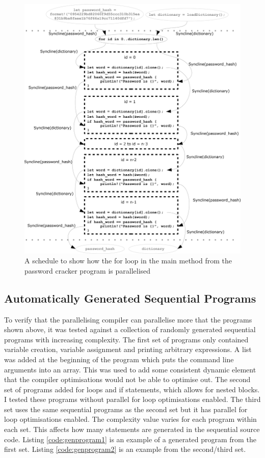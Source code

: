 \begin{figure}[H]
    \centering
    \includegraphics[width=\textwidth]{img/password-cracker/parallel-for.png}
    \caption{\label{fig:pass-for-sch}A schedule to show how the for loop in the main method from the password cracker program is parallelised}
\end{figure}

\subsection{Automatically Generated Sequential Programs}
To verify that the parallelising compiler can parallelise more that the programs shown above, it was tested against a collection of randomly generated sequential programs with increasing complexity. The first set of programs only contained variable creation, variable assignment and printing arbitrary expressions. A list was added at the beginning of the program which puts the command line arguments into an array. This was used to add some consistent dynamic element that the compiler optimisations would not be able to optimise out. The second set of programs added for loops and if statements, which allows for nested blocks. I tested these programs without parallel for loop optimisations enabled. The third set uses the same sequential programs as the second set but it has parallel for loop optimisations enabled. The complexity value varies for each program within each set. This affects how many statements are generated in the sequential source code. Listing \autoref{code:genprogram1} is an example of a generated program from the first set. Listing \autoref{code:genprogram2} is an example from the second/third set.

